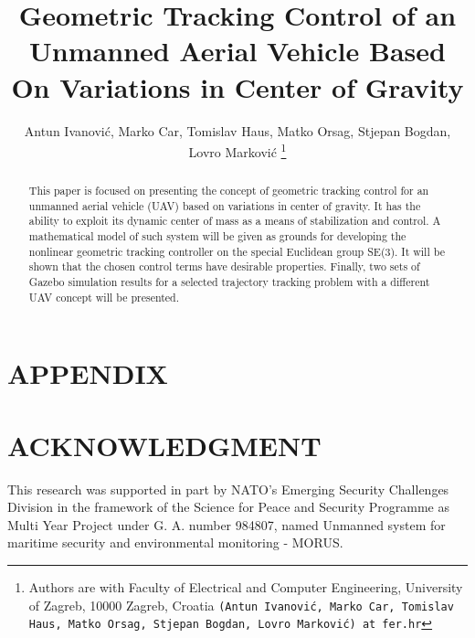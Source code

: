 \documentclass[letterpaper, 10 pt, conference]{ieeeconf}  %
\title{\LARGE \bf
Geometric Tracking Control of an Unmanned Aerial Vehicle Based On Variations in Center of Gravity
}
\author{Antun Ivanović, Marko Car, Tomislav Haus, Matko Orsag, Stjepan Bogdan, Lovro Marković
	\thanks{Authors are with Faculty of Electrical and Computer Engineering,
        University of Zagreb, 10000 Zagreb, Croatia
        {\tt\small (Antun Ivanović, Marko Car, Tomislav Haus, Matko Orsag, Stjepan Bogdan, Lovro Marković) at fer.hr}}}%
\begin{document}
\maketitle

\thispagestyle{empty}
\pagestyle{empty}


\begin{abstract}

This paper is focused on presenting the concept of geometric tracking control for an unmanned aerial vehicle (UAV) based on variations in center of gravity. It has the ability to exploit its dynamic center of mass as a means of stabilization and control. A mathematical model of such system will be given as grounds for developing the nonlinear geometric tracking controller on the special Euclidean group SE(3). It will be shown that the chosen control terms have desirable properties. Finally, two sets of Gazebo simulation results for a selected trajectory tracking problem with a different UAV concept will be presented.

\end{abstract}




%




\section*{APPENDIX}



\section*{ACKNOWLEDGMENT}

This research was supported in part by NATO's Emerging Security Challenges Division in the framework of the Science for Peace and Security Programme as Multi Year Project under G. A. number 984807, named Unmanned system for maritime security and environmental monitoring - MORUS.



\nocite{*}


\end{document}
